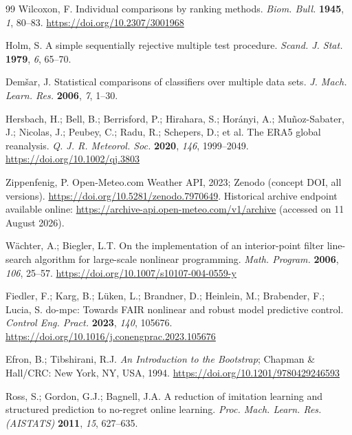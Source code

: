\begin{thebibliography}{99}
Wilcoxon, F. Individual comparisons by ranking methods. \textit{Biom. Bull.} \textbf{1945},
\textit{1}, 80--83. \url{https://doi.org/10.2307/3001968}

Holm, S. A simple sequentially rejective multiple test procedure. \textit{Scand. J. Stat.}
\textbf{1979}, \textit{6}, 65--70.

Dem\v{s}ar, J. Statistical comparisons of classifiers over multiple data sets.
\textit{J. Mach. Learn. Res.} \textbf{2006}, \textit{7}, 1--30.

Hersbach, H.; Bell, B.; Berrisford, P.; Hirahara, S.; Hor\'anyi, A.; Mu\~noz-Sabater, J.;
Nicolas, J.; Peubey, C.; Radu, R.; Schepers, D.; et al. The ERA5 global reanalysis.
\textit{Q. J. R. Meteorol. Soc.} \textbf{2020}, \textit{146}, 1999--2049.
\url{https://doi.org/10.1002/qj.3803}

Zippenfenig, P. Open-Meteo.com Weather API, 2023; Zenodo (concept DOI,
all versions). \url{https://doi.org/10.5281/zenodo.7970649}. Historical archive endpoint
available online: \url{https://archive-api.open-meteo.com/v1/archive}
(accessed on 11 August 2026).

W\"achter, A.; Biegler, L.T. On the implementation of an interior-point filter line-search
algorithm for large-scale nonlinear programming. \textit{Math. Program.} \textbf{2006},
\textit{106}, 25--57. \url{https://doi.org/10.1007/s10107-004-0559-y}

Fiedler, F.; Karg, B.; L\"uken, L.; Brandner, D.; Heinlein, M.; Brabender, F.; Lucia, S.
do-mpc: Towards FAIR nonlinear and robust model predictive control. \textit{Control Eng.
Pract.} \textbf{2023}, \textit{140}, 105676.
\url{https://doi.org/10.1016/j.conengprac.2023.105676}

Efron, B.; Tibshirani, R.J. \textit{An Introduction to the Bootstrap}; Chapman \& Hall/CRC:
New York, NY, USA, 1994. \url{https://doi.org/10.1201/9780429246593}

Ross, S.; Gordon, G.J.; Bagnell, J.A. A reduction of imitation learning and structured
prediction to no-regret online learning. \textit{Proc. Mach. Learn. Res. (AISTATS)}
\textbf{2011}, \textit{15}, 627--635.


\end{thebibliography}
